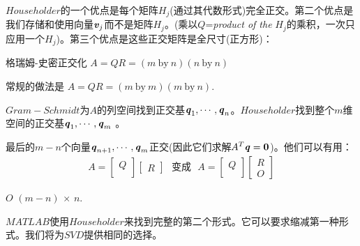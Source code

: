 $Householder$的一个优点是每个矩阵$H_{j}$(通过其代数形式)完全正交。第二个优点是我们存储和使用向量$\textbf{\textit{v}}_{j}$而不是矩阵$H_{j}$。(乘以$Q$=\textit{product of the} $H_{j}$的乘积，一次只应用一个$H_{j}$)。第三个优点是这些正交矩阵是全尺寸(正方形)：
\begin{center}
格瑞姆-史密正交化 $A=QR=(m \  \text{by} \  n)(n \  \text{by}  \ n)$
\end{center}
\begin{center}
常规的做法是 $A=QR=(m \  \text{by} \  m)(m \  \text{by} \  n)$.
\end{center}

$Gram-Schmidt$为$A$的列空间找到正交基$\textbf{\textit{q}}_{1},\cdots,\textbf{\textit{q}}_{n}$。$Householder$找到整个$m$维空间的正交基$\textbf{\textit{q}}_{1},\cdots,\textbf{\textit{q}}_{m}$ 。

最后的$m-n$个向量$\textbf{\textit{q}}_{n+1},\cdots,\textbf{\textit{q}}_{m}$正交(因此它们求解$ A^{T}\textbf{\textit{q}}=\textbf{0}$)。他们可以有用：
\begin{align*}
A=
\begin{bmatrix}
Q \\
\
\end{bmatrix}
\begin{bmatrix}
R 
\end{bmatrix} \ \ \   \text{变成} \  \  \ 
A=
\begin{bmatrix}
Q \\
\
\end{bmatrix}
\begin{bmatrix}
R\\
\textit{O} 
\end{bmatrix}
\end{align*}
\begin{flushleft}
	 $\textit{O}$  $(m-n)$ $\times$ $n$.
\end{flushleft}

$MATLAB$使用$Householder$来找到完整的第二个形式。它可以要求缩减第一种形式。我们将为$SVD$提供相同的选择。

 